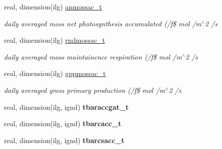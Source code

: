 \begin{DoxyCompactItemize}
\item 
\hypertarget{structctem__statevars_1_1ctem__tile__level_a3c36357d02c7aaf10e15e3cc69c05419}{}real, dimension(ilg) \hyperlink{structctem__statevars_1_1ctem__tile__level_a3c36357d02c7aaf10e15e3cc69c05419}{anmossac\+\_\+t}\label{structctem__statevars_1_1ctem__tile__level_a3c36357d02c7aaf10e15e3cc69c05419}

\begin{DoxyCompactList}\small\item\em daily averaged moss net photosynthesis accumulated (/f\$ mol /m$^\wedge$2 /s \end{DoxyCompactList}\item 
\hypertarget{structctem__statevars_1_1ctem__tile__level_afd0d6ecb23fdf6f6697a3c3034750dea}{}real, dimension(ilg) \hyperlink{structctem__statevars_1_1ctem__tile__level_afd0d6ecb23fdf6f6697a3c3034750dea}{rmlmossac\+\_\+t}\label{structctem__statevars_1_1ctem__tile__level_afd0d6ecb23fdf6f6697a3c3034750dea}

\begin{DoxyCompactList}\small\item\em daily averaged moss maintainence respiration (/f\$ mol /m$^\wedge$2 /s \end{DoxyCompactList}\item 
\hypertarget{structctem__statevars_1_1ctem__tile__level_acbb114e635c71ecd3f3585278510817c}{}real, dimension(ilg) \hyperlink{structctem__statevars_1_1ctem__tile__level_acbb114e635c71ecd3f3585278510817c}{gppmossac\+\_\+t}\label{structctem__statevars_1_1ctem__tile__level_acbb114e635c71ecd3f3585278510817c}

\begin{DoxyCompactList}\small\item\em daily averaged gross primary production (/f\$ mol /m$^\wedge$2 /s \end{DoxyCompactList}\item 
\hypertarget{structctem__statevars_1_1ctem__tile__level_a8f31daad9ae6b5714ee83c8f422b1346}{}real, dimension(ilg, ignd) {\bfseries tbaraccgat\+\_\+t}\label{structctem__statevars_1_1ctem__tile__level_a8f31daad9ae6b5714ee83c8f422b1346}

\item 
\hypertarget{structctem__statevars_1_1ctem__tile__level_a6ba8cb45612a25a836a9db28a7ff2601}{}real, dimension(ilg, ignd) {\bfseries tbarcacc\+\_\+t}\label{structctem__statevars_1_1ctem__tile__level_a6ba8cb45612a25a836a9db28a7ff2601}

\item 
\hypertarget{structctem__statevars_1_1ctem__tile__level_a71b93e9930e74f2e90f4cbb958730187}{}real, dimension(ilg, ignd) {\bfseries tbarcsacc\+\_\+t}\label{structctem__statevars_1_1ctem__tile__level_a71b93e9930e74f2e90f4cbb958730187}


\end{DoxyCompactItemize}
